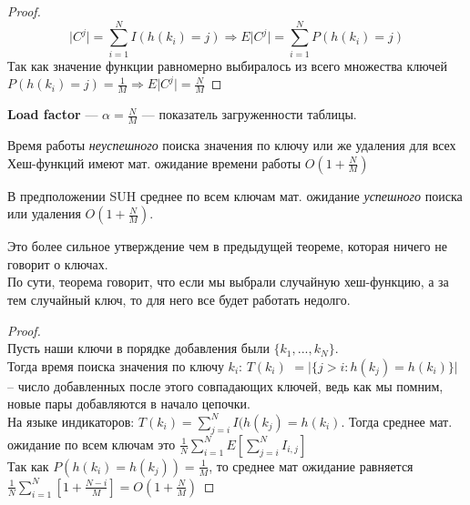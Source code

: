 \begin{proof} \ \\
    \[
        \lvert C^j \rvert = \sum \limits_{i = 1}^{N} I(h(k_i) = j)
        \Rightarrow E \lvert C^j \rvert = \sum \limits_{i = 1}^{N} P(h(k_i) = j)
    \]
    Так как значение функции равномерно выбиралось из всего множества ключей $P(h(k_i) = j) = \frac{1}{M} \Rightarrow E\lvert C^j \rvert = \frac{N}{M}$ 
\end{proof}

\begin{Def}
    \textbf{Load factor} --- $\alpha = \frac{N}{M}$ --- показатель загруженности таблицы.
\end{Def}

\begin{corollary}
    Время работы \textit{неуспешного} поиска значения по ключу или же удаления для всех Хеш-функций имеют мат. ожидание времени работы $O(1 + \frac{N}{M})$
\end {corollary}

\begin{theorem}
    В предположении SUH среднее по всем ключам мат. ожидание \textit{успешного} поиска или удаления $O(1 + \frac{N}{M})$.
\end{theorem}

\begin{note}
    Это более сильное утверждение чем в предыдущей теореме, которая ничего не говорит о ключах. \\
    По сути, теорема говорит, что если мы выбрали случайную хеш-функцию, а за тем случайный ключ, 
    то для него все будет работать недолго.
\end{note}

\begin{proof} \ \\
    Пусть наши ключи в порядке добавления были $\{k_1, ..., k_N\}$. \\
    Тогда время поиска значения по ключу $k_i$:  $T(k_i)$ $= \lvert \{j > i: h(k_j) = h(k_i)\} \rvert$ 
    -- число добавленных после этого совпадающих ключей, ведь как мы помним, новые пары добавляются в начало цепочки. \\
    На языке индикаторов: $T(k_i) = \sum \limits _{j = i} ^ {N} I(h(k_j) = h(k_i)$.
    Тогда среднее мат. ожидание по всем ключам это $\frac{1}{N} \sum \limits _{i = 1} ^ {N} E [\sum \limits _{j = i}^{N} I_{i, j}]$ \\
    Так как $P(h(k_i) = h(k_j)) = \frac{1}{M}$, то среднее мат ожидание равняется $\frac{1}{N} \sum \limits _{i = 1} ^ {N}[1 + \frac{N - i}{M}] = O(1 + \frac{N}{M})$
\end{proof}

